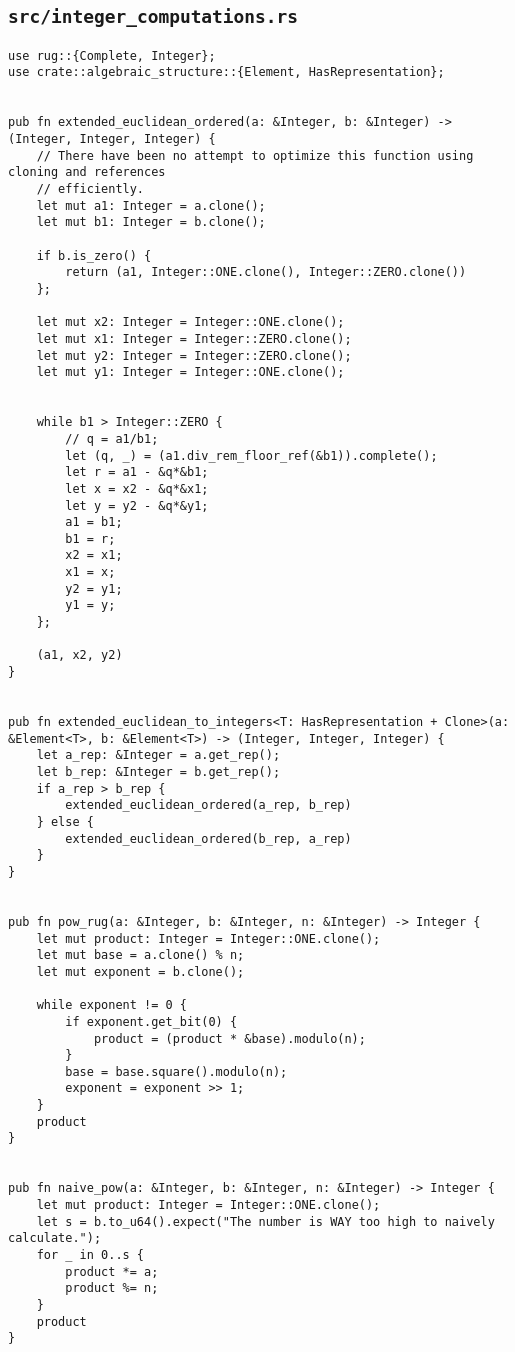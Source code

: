 \subsection{\lstinline{src/integer_computations.rs}}
\label{sec:integer-computations}

\begin{verbatim}
use rug::{Complete, Integer};
use crate::algebraic_structure::{Element, HasRepresentation};


pub fn extended_euclidean_ordered(a: &Integer, b: &Integer) -> (Integer, Integer, Integer) {
    // There have been no attempt to optimize this function using cloning and references
    // efficiently.
    let mut a1: Integer = a.clone();
    let mut b1: Integer = b.clone();

    if b.is_zero() {
        return (a1, Integer::ONE.clone(), Integer::ZERO.clone())
    };

    let mut x2: Integer = Integer::ONE.clone();
    let mut x1: Integer = Integer::ZERO.clone();
    let mut y2: Integer = Integer::ZERO.clone();
    let mut y1: Integer = Integer::ONE.clone();


    while b1 > Integer::ZERO {
        // q = a1/b1;
        let (q, _) = (a1.div_rem_floor_ref(&b1)).complete();
        let r = a1 - &q*&b1;
        let x = x2 - &q*&x1;
        let y = y2 - &q*&y1;
        a1 = b1;
        b1 = r;
        x2 = x1;
        x1 = x;
        y2 = y1;
        y1 = y;
    };

    (a1, x2, y2)
}


pub fn extended_euclidean_to_integers<T: HasRepresentation + Clone>(a: &Element<T>, b: &Element<T>) -> (Integer, Integer, Integer) {
    let a_rep: &Integer = a.get_rep();
    let b_rep: &Integer = b.get_rep();
    if a_rep > b_rep {
        extended_euclidean_ordered(a_rep, b_rep)
    } else {
        extended_euclidean_ordered(b_rep, a_rep)
    }
}


pub fn pow_rug(a: &Integer, b: &Integer, n: &Integer) -> Integer {
    let mut product: Integer = Integer::ONE.clone();
    let mut base = a.clone() % n;
    let mut exponent = b.clone();

    while exponent != 0 {
        if exponent.get_bit(0) {
            product = (product * &base).modulo(n);
        }
        base = base.square().modulo(n);
        exponent = exponent >> 1;
    }
    product
}


pub fn naive_pow(a: &Integer, b: &Integer, n: &Integer) -> Integer {
    let mut product: Integer = Integer::ONE.clone();
    let s = b.to_u64().expect("The number is WAY too high to naively calculate.");
    for _ in 0..s {
        product *= a;
        product %= n;
    }
    product
}
\end{verbatim}


